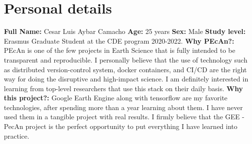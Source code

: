 \documentclass{eepecan}
\begin{document}
	\section{Personal details}	
	\textbf{Full Name:} Cesar Luis Aybar Camacho \newline \newline
	\textbf{Age:} 25 years \newline \newline
	\textbf{Sex:} Male \newline \newline
	\textbf{Study level:} Erasmus Graduate Student at the CDE program 2020-2022. \newline \newline
	\textbf{Why PEcAn?:} PEcAn is one of the few projects in Earth Science that is fully intended to be transparent and reproducible. I personally believe that the use of technology such as distributed version-control system, docker containers, and CI/CD are the right way for doing the disruptive and high-impact science. I am definitely interested in learning from top-level researchers that use this stack on their daily basis. \newline \newline
	\textbf{Why this project?:} Google Earth Engine along with tensorflow are my favorite technologies, after spending more than a year learning about them. I have never used them in a tangible project with real results. I firmly believe that the GEE - PecAn project is the perfect opportunity to put everything I have learned into practice. \newline \newline
		
\end{document}
